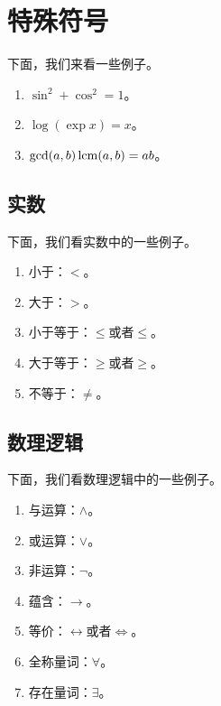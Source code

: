 
\section{特殊符号}

下面，我们来看一些例子。

\begin{enumerate}
    \item $\sin^2+\cos^2=1$。
    \item $\log (\exp x)  =x$。
    \item $\gcd(a,b)\operatorname{lcm}(a,b)=ab$。
\end{enumerate}

\subsection{实数}
下面，我们看实数中的一些例子。
\begin{enumerate}
    \item 小于：$<$。
    \item 大于：$>$。
    \item 小于等于：$\le$或者$\leqslant$。
    \item 大于等于：$\ge$或者$\geqslant$。
    \item 不等于：$\neq$。
\end{enumerate}

\subsection{数理逻辑}
下面，我们看数理逻辑中的一些例子。
\begin{enumerate}
    \item 与运算：$\land$。
    \item 或运算：$\lor$。
    \item 非运算：$\lnot$。
    \item 蕴含：$\to$。
    \item 等价：$\leftrightarrow$或者$\iff$。
    \item 全称量词：$\forall$。
    \item 存在量词：$\exists$。
\end{enumerate}

